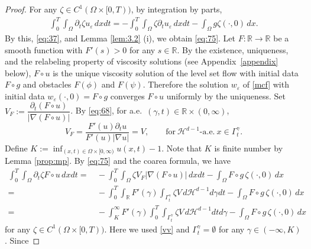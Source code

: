 \documentclass{amsart}
\theoremstyle{definition}
\def\R{{\mathbb{R}}}
\begin{document}
\begin{proof}
For any $\zeta \in C ^1 (\Omega \times [0,T))$, by integration by parts,
\begin{equation}
\begin{split}
\int_0 ^T \int_\Omega
\partial_t \zeta u_\varepsilon \, dxdt
= 
-\int_0 ^T \int_\Omega \zeta \partial _t u_\varepsilon \, dxdt
- \int_\Omega g \zeta (\cdot,0) \, dx.
\end{split}
\end{equation}
By this, \eqref{eq:37}, and Lemma \ref{lem:3.2} (i), we obtain \eqref{eq:75}.
Let $F:\R\to \R$ be a smooth function with $F' (s) >0$ for any $s \in \R$. By the existence, uniqueness, and the relabeling property of viscosity solutions (see Appendix~\ref{appendix} below), 
$F \circ u$ is the unique viscosity solution of the level set flow with initial data $F \circ g$ and obstacles $F(\phi)$ and $F(\psi)$. Therefore
the solution $w_\varepsilon$
of \eqref{mcf} with initial data $w_\varepsilon (\cdot,0)=F \circ g$ converges $F \circ u $
uniformly by the uniqueness.
Set $V_{F} := \dfrac{\partial _t (F \circ u)}{|\nabla (F \circ u)|}$. 
By \eqref{eq:68},
for a.e.\ $(\gamma, t) \in \R \times (0,\infty)$, 
\begin{equation}
\label{vv}
V_{F} = 
\frac{F' (u) \partial _t u}{F' (u) |\nabla u| }=V,
\qquad 
\text{for} \ \mathcal{H}^{d-1} \text{-a.e.} \ x \in \Gamma_t ^\gamma. 
\end{equation}
Define $K:= \inf_{(x,t) \in \Omega\times [0,\infty)} u(x,t) -1$. Note that $K$ is finite number by Lemma \ref{prop:mp}.
By \eqref{eq:75} and the coarea formula,
we have
\begin{equation}\label{eq:78}
\begin{split}
\int_0 ^T \int_\Omega
\partial_t \zeta F \circ u \, dxdt
= & \, 
-\int_0 ^T \int_\Omega \zeta V_{F} |\nabla (F \circ u)| \, dxdt
- \int_\Omega F \circ g\, \zeta (\cdot,0) \, dx \\
= & \, 
-\int_0 ^T \int _\R F' (\gamma) \int_{\Gamma_t ^\gamma} \zeta V \, d\mathcal{H}^{d-1} d\gamma dt
- \int_\Omega F \circ g\, \zeta (\cdot,0) \, dx \\
= & \, 
-\int _K ^\infty F' (\gamma) \int_0 ^T \int_{\Gamma_t ^\gamma} \zeta V \, d\mathcal{H}^{d-1} dt d\gamma
- \int_\Omega F \circ g \,\zeta (\cdot,0) \, dx
\end{split}
\end{equation}
for any $\zeta \in C ^1 (\Omega \times [0,T))$.
Here we used \eqref{vv} and $\Gamma_ t ^\gamma =\emptyset$ for any $\gamma \in (-\infty,K)$.
Since

\end{proof}
\end{document}
